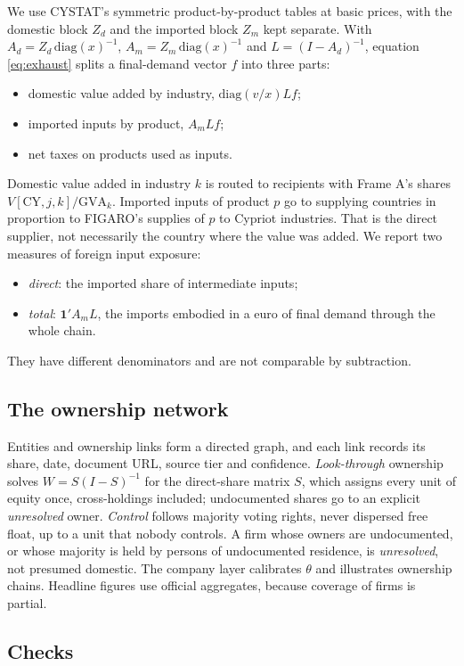 \documentclass[11pt]{article}
\begin{document}
We use CYSTAT's symmetric product-by-product tables at basic prices, with the domestic block $Z_d$ and the imported block $Z_m$ kept separate.
With $A_d=Z_d\,\mathrm{diag}(x)^{-1}$, $A_m=Z_m\,\mathrm{diag}(x)^{-1}$ and $L=(I-A_d)^{-1}$, equation \eqref{eq:exhaust} splits a final-demand vector $f$ into three parts:
\begin{itemize}
\item domestic value added by industry, $\mathrm{diag}(v/x)Lf$;
\item imported inputs by product, $A_mLf$;
\item net taxes on products used as inputs.
\end{itemize}
Domestic value added in industry $k$ is routed to recipients with Frame A's shares $V[\text{CY},j,k]/\text{GVA}_k$.
Imported inputs of product $p$ go to supplying countries in proportion to FIGARO's supplies of $p$ to Cypriot industries.
That is the direct supplier, not necessarily the country where the value was added.
We report two measures of foreign input exposure:
\begin{itemize}
\item \emph{direct}: the imported share of intermediate inputs;
\item \emph{total}: $\mathbf 1'A_mL$, the imports embodied in a euro of final demand through the whole chain.
\end{itemize}
They have different denominators and are not comparable by subtraction.

\subsection{The ownership network}

Entities and ownership links form a directed graph, and each link records its share, date, document URL, source tier and confidence.
\emph{Look-through} ownership solves $W=S(I-S)^{-1}$ for the direct-share matrix $S$, which assigns every unit of equity once, cross-holdings included; undocumented shares go to an explicit \emph{unresolved} owner.
\emph{Control} follows majority voting rights, never dispersed free float, up to a unit that nobody controls.
A firm whose owners are undocumented, or whose majority is held by persons of undocumented residence, is \emph{unresolved}, not presumed domestic.
The company layer calibrates $\theta$ and illustrates ownership chains.
Headline figures use official aggregates, because coverage of firms is partial.

\subsection{Checks}
\end{document}
